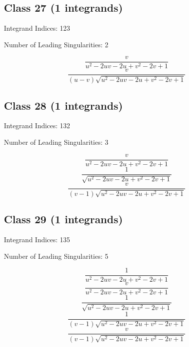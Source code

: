 \documentclass[11pt,a4paper]{article}
\begin{document}
\subsection*{Class 27 (1 integrands)}
Integrand Indices: 123

Number of Leading Singularities: 2

\begin{equation}
\frac{v}{u^2-2 u v-2 u+v^2-2 v+1}
\end{equation}
\begin{equation}
\frac{v}{(u-v) \sqrt{u^2-2 u v-2 u+v^2-2 v+1}}
\end{equation}


\subsection*{Class 28 (1 integrands)}
Integrand Indices: 132

Number of Leading Singularities: 3

\begin{equation}
\frac{v}{u^2-2 u v-2 u+v^2-2 v+1}
\end{equation}
\begin{equation}
\frac{1}{\sqrt{u^2-2 u v-2 u+v^2-2 v+1}}
\end{equation}
\begin{equation}
\frac{v}{(v-1) \sqrt{u^2-2 u v-2 u+v^2-2 v+1}}
\end{equation}


\subsection*{Class 29 (1 integrands)}
Integrand Indices: 135

Number of Leading Singularities: 5

\begin{equation}
\frac{1}{u^2-2 u v-2 u+v^2-2 v+1}
\end{equation}
\begin{equation}
\frac{v}{u^2-2 u v-2 u+v^2-2 v+1}
\end{equation}
\begin{equation}
\frac{1}{\sqrt{u^2-2 u v-2 u+v^2-2 v+1}}
\end{equation}
\begin{equation}
\frac{1}{(v-1) \sqrt{u^2-2 u v-2 u+v^2-2 v+1}}
\end{equation}
\begin{equation}
\frac{v}{(v-1) \sqrt{u^2-2 u v-2 u+v^2-2 v+1}}
\end{equation}
\end{document}
